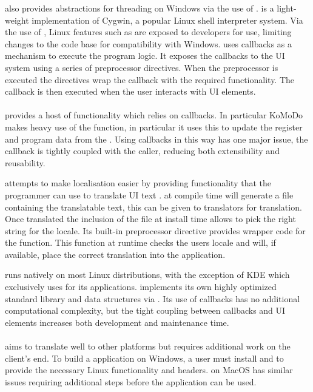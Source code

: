    also provides abstractions for threading on Windows via the use of \cite{msys}.  is a light-weight implementation of Cygwin, a popular Linux shell interpreter system. Via the use of , Linux features such as  are exposed to developers for use, limiting changes to the code base for compatibility with Windows.
   uses callbacks as a mechanism to execute the program logic. It exposes the callbacks to the  UI system using a series of preprocessor directives. When the preprocessor is executed the directives wrap the callback with the required functionality. The callback is then executed when the user interacts with UI elements.\\\\
   provides a host of functionality which relies on callbacks. In particular KoMoDo makes heavy use of the  function, in particular it uses this to update the register and program data from the . Using callbacks in this way has one major issue, the callback is tightly coupled with the caller, reducing both extensibility and reusability.

   attempts to make localisation easier by providing functionality that the programmer can use to translate UI text \cite{gtk_localisation}.  at compile time will generate a file containing the translatable text, this can be given to translators for translation. Once translated the inclusion of the file at install time allows  to pick the right string for the locale. Its built-in preprocessor directive provides wrapper code for the  function. This function at runtime checks the users locale and will, if available, place the correct translation into the application.

   runs natively on most Linux distributions, with the exception of KDE which exclusively uses  for its applications.  implements its own highly optimized standard library and data structures via \cite{glib}. Its use of callbacks has no additional computational complexity, but the tight coupling between callbacks and UI elements increases both development and maintenance time.\\\\
   aims to translate well to other platforms but requires additional work on the client's end. To build a  application on Windows, a user must install  and  to provide the necessary Linux functionality and headers.  on MacOS has similar issues requiring additional steps before the application can be used.

